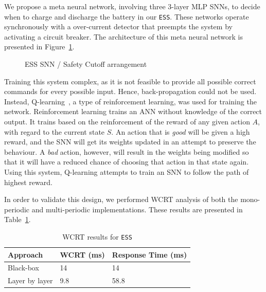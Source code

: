 We propose a meta neural network, involving three 3-layer \ac{MLP} \acp{SNN}, to decide when to charge and discharge the battery in our \texttt{ESS}.
These networks operate synchronously with a over-current detector
that preempts the system by activating a circuit breaker.
The architecture of this meta neural network is presented in Figure~\ref{fig:ess-sanns}. 

\begin{figure}[H]
	\centering
	\scalebox{0.7}{}
	\caption{ESS \ac{SNN} / Safety Cutoff arrangement}
	\label{fig:ess-sanns}
\end{figure}

Training this system complex, as it is not
feasible to provide all possible correct commands for every possible
input. Hence, back-propagation could not be used.
Instead, Q-learning~\cite{qlearning2010}, a type of reinforcement learning, was used for training the network.
Reinforcement learning trains an \ac{ANN} without knowledge of the correct output. 
It trains based on the reinforcement of the reward of any given action $A$, with regard to the current state $S$. 
An action that is \emph{good} will be given a high reward, and the \ac{SNN} will get its weights updated in an attempt to preserve the behaviour.
A \emph{bad} action, however, will result in the  weights being modified so that it will have a reduced chance of choosing that action in that state again. 
Using this system, Q-learning attempts to train an \ac{SNN} to follow the path of highest reward.


In order to validate this design, we performed \ac{WCRT} analysis of
both the mono-periodic and multi-periodic implementations. 
These results are presented in Table~\ref{tbl:res-ess}.

\begin{table}[H]
	\centering
	\caption{\ac{WCRT} results for \texttt{ESS}}
	\label{tbl:res-ess}
	\begin{tabular}{|l|l|l|}
		\hline
		Approach         & WCRT (ms) & Response Time (ms)\\ \hline
		Black-box        & 14   & 14 \\ 
		Layer by layer   & 9.8  & 58.8 \\ \hline
	\end{tabular}
\end{table}

